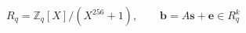 \documentclass[border=6pt]{standalone}
\begin{document}
\color{ptitnavy}
\(\displaystyle R_q=\mathbb{Z}_q[X]/(X^{256}+1),\qquad \mathbf{b}=A\mathbf{s}+\mathbf{e}\in R_q^k\)
\end{document}
